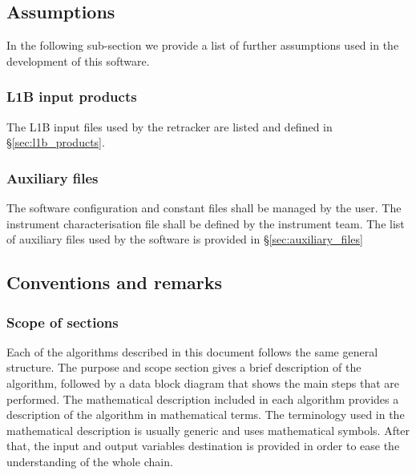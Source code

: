 \documentclass[11pt,a4paper]{article}
\begin{document}
\begingroup 
\renewcommand{\section}[2]{}%

\endgroup


\subsection{Assumptions}


In the following sub-section we provide a list of further assumptions used in the development of this software.

\subsubsection{L1B input products}

The L1B input files used by the retracker are listed and defined in \S\ref{sec:l1b_products}.

\subsubsection{Auxiliary files}

The software configuration and constant files shall be managed by the user. The instrument characterisation file shall be defined by the instrument team. The list of auxiliary files used by the software is provided in \S\ref{sec:auxiliary_files}



\subsection{Conventions and remarks}

\subsubsection{Scope of sections}

Each of the algorithms described in this document follows the same general structure. The purpose and scope section gives a brief description of the algorithm, followed by a data block diagram that shows the main steps that are performed. The mathematical description included in each algorithm provides a description of the algorithm in mathematical terms. The terminology used in the mathematical description is usually generic and uses mathematical symbols. After that, the input and output variables destination is provided in order to ease the understanding of the whole chain.
\end{document}
